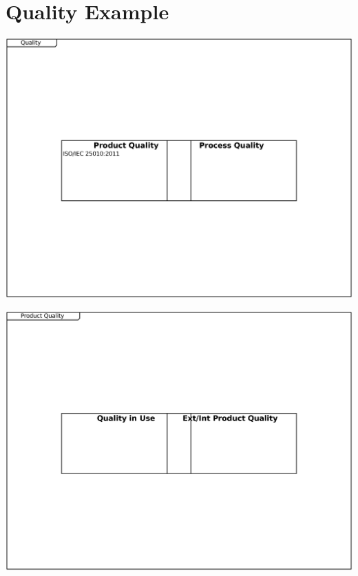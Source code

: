 \documentclass{article}
\begin{document}
\section{Quality Example}

\includegraphics[width= 1.0\linewidth]{quality_export/1_Quality.pdf}
\begin{alltt}

\end{alltt}

\includegraphics[width= 1.0\linewidth]{quality_export/2_Product_Quality.pdf}
\begin{alltt}

\end{alltt}
\end{document}

